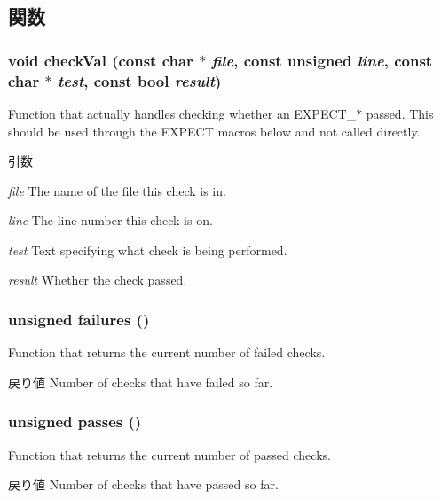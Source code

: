 \subsection{関数}
\hypertarget{namespaceUnitTest_aaeea6aae1b9fc9fde2eb06e2cdb95b77}{
\subsubsection[{checkVal}]{\setlength{\rightskip}{0pt plus 5cm}void checkVal (const char $\ast$ {\em file}, \/  const unsigned {\em line}, \/  const char $\ast$ {\em test}, \/  const bool {\em result})}}
\label{namespaceUnitTest_aaeea6aae1b9fc9fde2eb06e2cdb95b77}
Function that actually handles checking whether an EXPECT\_\-$\ast$ passed. This should be used through the EXPECT macros below and not called directly. 
\begin{DoxyParams}{引数}
\item[{\em file}]The name of the file this check is in. \item[{\em line}]The line number this check is on. \item[{\em test}]Text specifying what check is being performed. \item[{\em result}]Whether the check passed. \end{DoxyParams}
\hypertarget{namespaceUnitTest_a8c0151028e98183841c13b41f180a0d3}{
\subsubsection[{failures}]{\setlength{\rightskip}{0pt plus 5cm}unsigned failures ()}}
\label{namespaceUnitTest_a8c0151028e98183841c13b41f180a0d3}
Function that returns the current number of failed checks. \begin{DoxyReturn}{戻り値}
Number of checks that have failed so far. 
\end{DoxyReturn}
\hypertarget{namespaceUnitTest_a9638f40b9823e54879efe5e0c75a6bfe}{
\subsubsection[{passes}]{\setlength{\rightskip}{0pt plus 5cm}unsigned passes ()}}
\label{namespaceUnitTest_a9638f40b9823e54879efe5e0c75a6bfe}
Function that returns the current number of passed checks. \begin{DoxyReturn}{戻り値}
Number of checks that have passed so far. 
\end{DoxyReturn}
